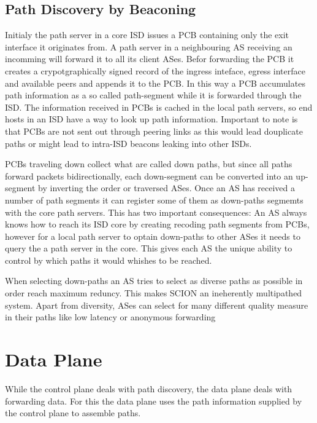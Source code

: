 \documentclass[../eva1_scion.tex]{subfiles}
\begin{document}
    \subsection{Path Discovery by Beaconing}\label{ssec:beaconing}
    Initialy the path server in a core ISD issues a PCB containing only the exit interface it originates from. A path server in a neighbouring AS receiving an incomming will forward it to all its client ASes. Befor forwarding the PCB it creates a crypotgraphically signed record of the ingress inteface, egress interface and available peers and appends it to the PCB. In this way a PCB accumulates path information as a so called path-segment while it is forwarded through the ISD. The information received in PCBs is cached in the local path servers, so end hosts in an ISD have a way to look up path information. Important to note is that PCBs are not sent out through peering links as this would lead douplicate paths or might lead to intra-ISD beacons leaking into other ISDs.

    PCBs traveling down collect what are called down paths, but since all paths forward packets bidirectionally, each down-segment can be converted into an up-segment by inverting the order or traversed ASes. Once an AS has received a number of path segments it can register some of them as down-paths segmemts with the core path servers. This has two important consequences:  An AS always knows how to reach its ISD core by creating recoding path segments from PCBs, however for a local path server to optain down-paths to other ASes it needs to query the a path server in the core. This gives each AS the unique ability to control by which paths it would whishes to be reached.

    When selecting down-paths an AS tries to select as diverse paths as possible in order reach maximum reduncy. This makes SCION an ineherently multipathed system. Apart from diversity, ASes can select for many different quality measure in their paths like low latency or anonymous forwarding

    \section{Data Plane}
    While the control plane deals with path discovery, the data plane deals with forwarding data. For this the data plane uses the path information supplied by the control plane to assemble paths.
\end{document}
